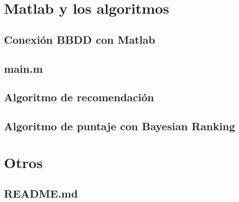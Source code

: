\documentclass[a4paper, 12pt]{report}
\begin{document}
    \chapter{Matlab y los algoritmos}
    \section{Conexión BBDD con Matlab}
    \section{main.m}
    \section{Algoritmo de recomendación}
    \section{Algoritmo de puntaje con Bayesian Ranking}

    \chapter{Otros}
    \section{README.md}

    
\end{document}
